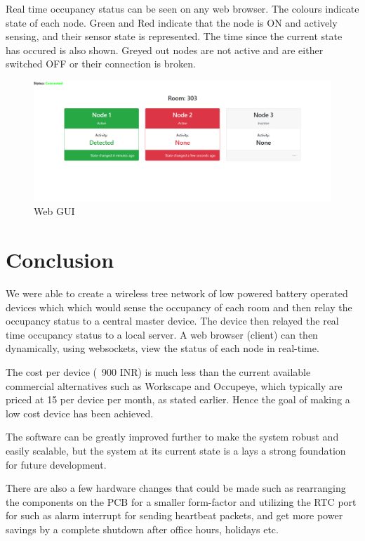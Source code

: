 \documentclass[journal]{IEEEtran}
\begin{document}
Real time occupancy status can be seen on any web browser. The colours indicate state of each node. Green and Red indicate that the node is ON and actively sensing, and their sensor state is represented. The time since the current state has occured is also shown. Greyed out nodes are not active and are either switched OFF or their connection is broken. 
 
\begin{figure}[ht]
	\centering
	\includegraphics[scale=.2]{Website1.PNG}
	\caption{Web GUI}
	\label{fig_gui}
\end{figure}

\section{Conclusion}
We were able to create a wireless tree network of low powered battery operated devices which which would sense the occupancy of each room and then relay the occupancy status to a central master device. The device then relayed the real time occupancy status to a local server. A web browser (client) can then dynamically, using websockets, view the status of each node in real-time.

The cost per device (~900 INR) is much less than the current available commercial alternatives such as Workscape\cite{workscape} and Occupeye\cite{occupeye}, which typically are priced at 15\textdollar \hspace{1pt} per device per month, as stated earlier. Hence the goal of making a low cost device has been achieved.

The software can be greatly improved further to make the system robust and easily scalable, but the system at its current state is a lays a strong foundation for future development.

There are also a few hardware changes that could be made such as rearranging the components on the PCB for a smaller form-factor and utilizing the RTC port for such as alarm interrupt for sending heartbeat packets, and get more power savings by a complete shutdown after office hours, holidays etc.
\end{document}
